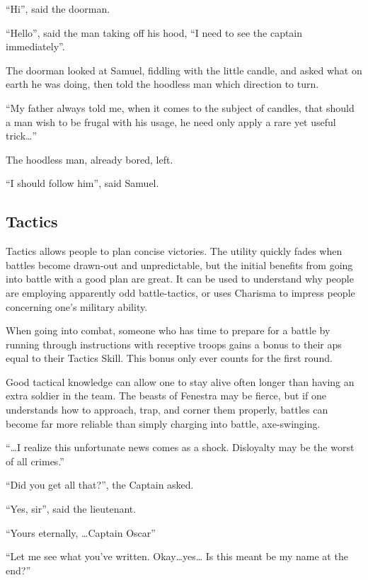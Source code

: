 \begin{multicols}{2}
\begin{exampletext}
  ``Hi'', said the doorman.

  ``Hello'', said the man taking off his hood, ``I need to see the captain immediately''.

  The doorman looked at Samuel, fiddling with the little candle, and asked what on earth he was doing, then told the hoodless man which direction to turn.

  ``My father always told me, when it comes to the subject of candles, that should  a man wish to be frugal with his usage, he need only apply a rare yet useful trick\ldots''

  The hoodless man, already bored, left.

  ``I should follow him'', said Samuel.
\end{exampletext}

\subsection{Tactics}

Tactics allows people to plan concise victories.
The utility quickly fades when battles become drawn-out and unpredictable, but the initial benefits from going into battle with a good plan are great.
It can be used to understand why people are employing apparently odd battle-tactics, or uses Charisma to impress people concerning one's military ability.

When going into combat, someone who has time to prepare for a battle by running through instructions with receptive troops gains a bonus to their \glspl{ap} equal to their Tactics Skill.
This bonus only ever counts for the first \gls{round}.

Good tactical knowledge can allow one to stay alive often longer than having an extra soldier in the team.
The beasts of Fenestra may be fierce, but if one understands how to approach, trap, and corner them properly, battles can become far more reliable than simply charging into battle, axe-swinging.

\begin{exampletext}

  ``\ldots I realize this unfortunate news comes as a shock.
  Disloyalty may be the worst of all crimes.''

  ``Did you get all that?'', the Captain asked.

  ``Yes, sir'', said the lieutenant.

  ``Yours eternally, \ldots Captain Oscar''

  ``Let me see what you've written.
  Okay\ldots yes\ldots
  Is this meant be my name at the end?''


\end{exampletext}
\end{multicols}

